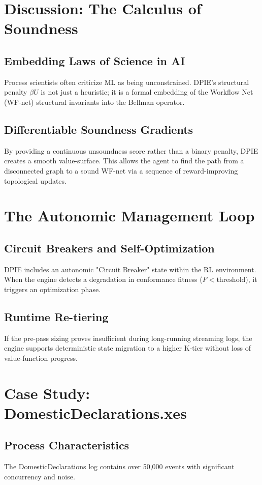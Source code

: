 \documentclass[12pt,a4paper]{report}
\begin{document}
\chapter{Discussion: The Calculus of Soundness}
\section{Embedding Laws of Science in AI}
Process scientists often criticize ML as being unconstrained. DPIE's structural penalty $\beta U$ is not just a heuristic; it is a formal embedding of the Workflow Net (WF-net) structural invariants into the Bellman operator.

\section{Differentiable Soundness Gradients}
By providing a continuous unsoundness score rather than a binary penalty, DPIE creates a smooth value-surface. This allows the agent to find the path from a disconnected graph to a sound WF-net via a sequence of reward-improving topological updates.

\chapter{The Autonomic Management Loop}
\section{Circuit Breakers and Self-Optimization}
DPIE includes an autonomic "Circuit Breaker" state within the RL environment. When the engine detects a degradation in conformance fitness ($F < \text{threshold}$), it triggers an optimization phase.

\section{Runtime Re-tiering}
If the pre-pass sizing proves insufficient during long-running streaming logs, the engine supports deterministic state migration to a higher K-tier without loss of value-function progress.

\chapter{Case Study: DomesticDeclarations.xes}
\section{Process Characteristics}
The DomesticDeclarations log contains over 50,000 events with significant concurrency and noise. 
\end{document}
